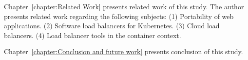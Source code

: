 Chapter~\ref{chapter:Related Work} presents related work of this study.
%
The author presents related work regarding the following subjects:
(1) Portability of web applications.
(2) Software load balancers for Kubernetes.
(3) Cloud load balancers.
(4) Load balancer tools in the container context.

%
Chapter~\ref{chapter:Conclusion and future work} presents conclusion of this study.



